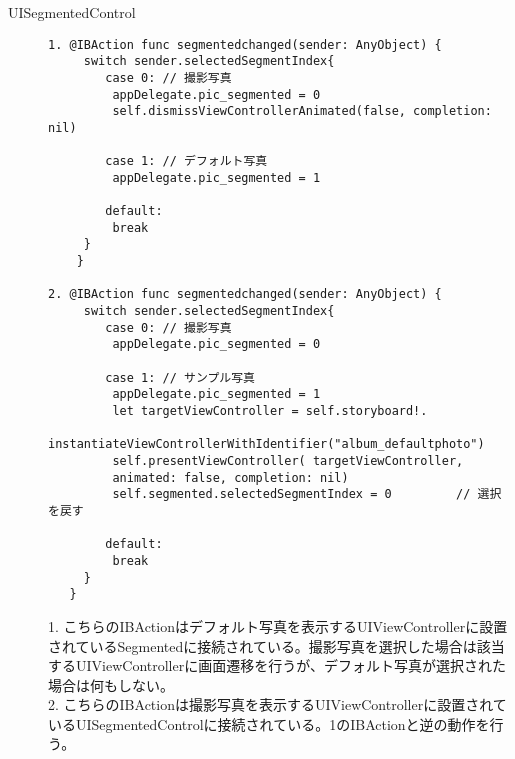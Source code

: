 \begin{description}
\item[UISegmentedControl]\mbox{} 
\begin{lstlisting}[basicstyle=\ttfamily\footnotesize, frame=single]
1. @IBAction func segmentedchanged(sender: AnyObject) {
     switch sender.selectedSegmentIndex{
        case 0: // 撮影写真
         appDelegate.pic_segmented = 0
         self.dismissViewControllerAnimated(false, completion: nil)
         
        case 1: // デフォルト写真
         appDelegate.pic_segmented = 1
         
        default:
         break
     }
    }

2. @IBAction func segmentedchanged(sender: AnyObject) {
     switch sender.selectedSegmentIndex{
        case 0: // 撮影写真
         appDelegate.pic_segmented = 0
            
        case 1: // サンプル写真
         appDelegate.pic_segmented = 1
         let targetViewController = self.storyboard!.
         instantiateViewControllerWithIdentifier("album_defaultphoto")
         self.presentViewController( targetViewController, 
         animated: false, completion: nil)
         self.segmented.selectedSegmentIndex = 0         // 選択を戻す
         
        default:
         break
     }
   }
\end{lstlisting}

1. こちらのIBActionはデフォルト写真を表示するUIViewControllerに設置されているSegmentedに接続されている。撮影写真を選択した場合は該当するUIViewControllerに画面遷移を行うが、デフォルト写真が選択された場合は何もしない。 \\
2. こちらのIBActionは撮影写真を表示するUIViewControllerに設置されているUISegmentedControlに接続されている。1のIBActionと逆の動作を行う。 \\

\end{description}

\newpage

